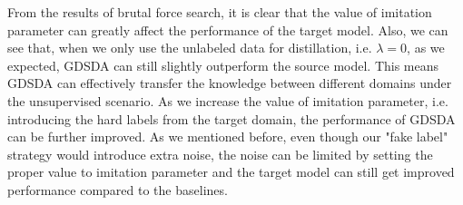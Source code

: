 From the results of brutal force search, it is clear that the value of imitation parameter can greatly affect the performance of the target model.
Also, we can see that, when we only use the unlabeled data for distillation, i.e. $\lambda = 0$, as we expected, GDSDA can still slightly outperform the source model. This means GDSDA can effectively transfer the knowledge between different domains under the unsupervised scenario. As we increase the value of imitation parameter, i.e. introducing the hard labels from the target domain, the performance of GDSDA can be further improved. As we mentioned before, even though our "fake label" strategy would introduce extra noise, the noise can be limited by setting the proper value to imitation parameter and the target model can still get improved performance compared to the baselines.

